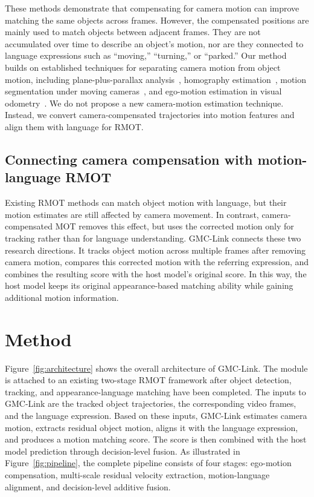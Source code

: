 \documentclass[sigconf,anonymous,nonacm]{acmart}
\begin{document}
These methods demonstrate that compensating for camera motion can improve matching the same objects across frames. However, the compensated positions are mainly used to match objects between adjacent frames. They are not accumulated over time to describe an object's motion, nor are they connected to language expressions such as ``moving,'' ``turning,'' or ``parked.'' Our method builds on established techniques for separating camera motion from object motion, including plane-plus-parallax analysis~\cite{iranianandan}, homography estimation~\cite{hartleyzisserman}, motion segmentation under moving cameras~\cite{bideau}, and ego-motion estimation in visual odometry~\cite{scaramuzza}. We do not propose a new camera-motion estimation technique. Instead, we convert camera-compensated trajectories into motion features and align them with language for RMOT.

\subsection{Connecting camera compensation with motion-language RMOT}

Existing RMOT methods can match object motion with language, but their motion estimates are still affected by camera movement. In contrast, camera-compensated MOT removes this effect, but uses the corrected motion only for tracking rather than for language understanding. GMC-Link connects these two research directions. It tracks object motion across multiple frames after removing camera motion, compares this corrected motion with the referring expression, and combines the resulting score with the host model's original score. In this way, the host model keeps its original appearance-based matching ability while gaining additional motion information.

\section{Method}
\label{sec:method}

Figure~\ref{fig:architecture} shows the overall architecture of GMC-Link. The module is attached to an existing two-stage RMOT framework after object detection, tracking, and appearance-language matching have been completed. The inputs to GMC-Link are the tracked object trajectories, the corresponding video frames, and the language expression. Based on these inputs, GMC-Link estimates camera motion, extracts residual object motion, aligns it with the language expression, and produces a motion matching score. The score is then combined with the host model prediction through decision-level fusion. As illustrated in Figure~\ref{fig:pipeline}, the complete pipeline consists of four stages: ego-motion compensation, multi-scale residual velocity extraction, motion-language alignment, and decision-level additive fusion.
\end{document}
